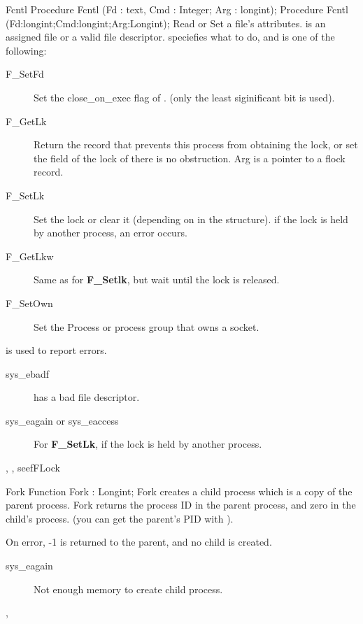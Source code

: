 \begin{procedure}{Fcntl}
\Declaration
Procedure Fcntl (Fd :  text, Cmd : Integer; Arg : longint);
Procedure Fcntl (Fd:longint;Cmd:longint;Arg:Longint);
\Description
Read or Set a file's attributes.  is an assigned file or a
valid file descriptor.
 speciefies what to do, and is one of the following:
\begin{description}
\item[F\_SetFd] Set the close\_on\_exec flag of . (only the least
siginificant bit is used).
\item[F\_GetLk] Return the  record that prevents this process from
obtaining the lock, or set the  field of the lock of there is no
obstruction. Arg is a pointer to a flock record.
\item[F\_SetLk] Set the lock or clear it (depending on  in the
 structure). if the lock is held by another process, an error
occurs.
\item[F\_GetLkw] Same as for \textbf{F\_Setlk}, but wait until the lock is
released.
\item[F\_SetOwn] Set the Process or process group that owns a socket.
\end{description}

\Errors

 is used to report errors.
\begin{description}
\item[sys\_ebadf]  has a bad file descriptor.
\item[sys\_eagain or sys\_eaccess] For \textbf{F\_SetLk}, if the lock is
held by another process.
\end{description}

\SeeAlso
{}, , seef{FLock}
\end{procedure}

\begin{function}{Fork}
\Declaration
Function Fork  : Longint;
\Description
Fork creates a child process which is a copy of the parent process.
Fork returns the process ID in the parent process, and zero in the child's
process. (you can get the parent's PID with ).

\Errors
On error, -1 is returned to the parent, and no child is created.
\begin{description}
\item [sys\_eagain] Not enough memory to create child process.
\end{description}

\SeeAlso
{}, 
\end{function}

